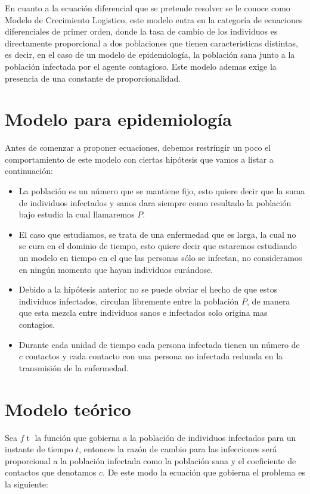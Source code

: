 \documentclass[12pt]{report}
\newcommand{\parg}[1]{\mathop{\big( #1 \big)}}
\begin{document}
En cuanto a la ecuación diferencial que se pretende resolver se le conoce como Modelo de Crecimiento Logistico, este modelo entra en la categoría de ecuaciones diferenciales de primer orden, donde la tasa de cambio de los individuos es directamente proporcional a dos poblaciones que tienen caracteristicas distintas, es decir, en el caso de un modelo de epidemiología, la población sana junto a la población infectada por el agente contagioso. Este modelo ademas exige la presencia de una constante de proporcionalidad.

\newpage

\section{Modelo para epidemiología}
Antes de comenzar a proponer ecuaciones, debemos restringir un poco el comportamiento de este modelo con ciertas hipótesis que vamos a listar a continuación:
\begin{itemize}
\item La población es un número que se mantiene fijo, esto quiere decir que la suma de individuos infectados y sanos dara siempre como resultado la población bajo estudio la cual llamaremos $P$.
\item El caso que estudiamos, se trata de una enfermedad que es larga, la cual no se cura en el dominio de tiempo, esto quiere decir que estaremos estudiando un modelo en tiempo en el que las personas sólo se infectan, no consideramos en ningún momento que hayan individuos curándose.
\item Debido a la hipótesis anterior no se puede obviar el hecho de que estos individuos infectados, circulan libremente entre la población $P$, de manera que esta mezcla entre individuos sanos e infectados solo origina mas contagios.
\item Durante cada unidad de tiempo cada persona infectada tienen un número de $c$ contactos y cada contacto con una persona no infectada redunda en la transmisión de la enfermedad.
\end{itemize}

\newpage

\section{Modelo teórico}
Sea $f\parg{t}$ la función que gobierna a la población de individuos infectados para un instante de tiempo $t$, entonces la razón de cambio para las infecciones será proporcional a la población infectada como la población sana y el coeficiente de contactos que denotamos $c$. De este modo la ecuación que gobierna el problema es la siguiente:
\end{document}

